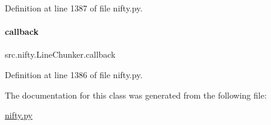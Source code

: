 Definition at line 1387 of file nifty.\+py.

\mbox{\label{classsrc_1_1nifty_1_1LineChunker_a6700f1ac30f31d8396b102c9565a0984}} 
\paragraph{\texorpdfstring{callback}{callback}}
{\footnotesize\ttfamily src.\+nifty.\+Line\+Chunker.\+callback}



Definition at line 1386 of file nifty.\+py.



The documentation for this class was generated from the following file\+:\begin{DoxyCompactItemize}
\item 
\hyperlink{nifty_8py}{nifty.\+py}\end{DoxyCompactItemize}
